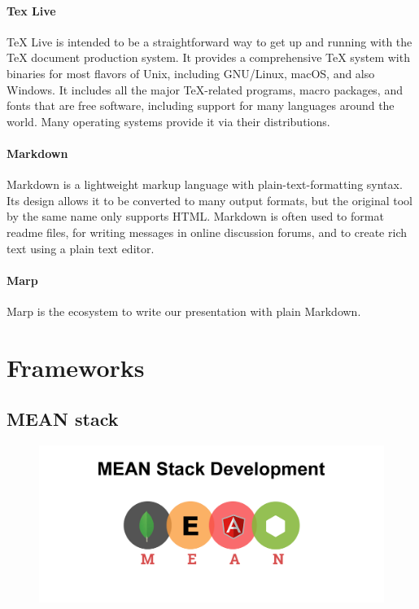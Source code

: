 \paragraph{Tex Live}
TeX Live is intended to be a straightforward way to get up and running with the TeX document production system. It provides a comprehensive TeX system with binaries for most flavors of Unix, including GNU/Linux, macOS, and also Windows. It includes all the major TeX-related programs, macro packages, and fonts that are free software, including support for many languages around the world. Many operating systems provide it via their distributions.



\paragraph{Markdown}
Markdown is a lightweight markup language with plain-text-formatting syntax. Its design allows it to be converted to many output formats, but the original tool by the same name only supports HTML. Markdown is often used to format readme files, for writing messages in online discussion forums, and to create rich text using a plain text editor.
\paragraph{Marp}
Marp is the ecosystem to write our presentation with plain Markdown.


\section{Frameworks}
\subsection*{MEAN stack}

\begin{figure}[!ht]
      \center
      \includegraphics[scale=0.30]{assets/meanstack.png}
\end{figure}

